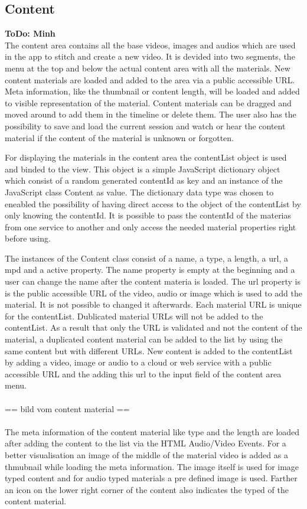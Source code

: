 \documentclass[conference]{IEEEtran}
\begin{document}
\newpage

\subsection{Content}
\textbf{ToDo: Minh} \\
The content area contains all the base videos, images and audios which are used in the app to stitch and create a new video. It is devided into two segments, the menu at the top and below the actual content area with all the materials. New content materials are loaded and added to the area via a public accessible URL. Meta information, like the thumbnail or content length, will be loaded and added to visible representation of the material. Content materials can be dragged and moved around to add them in the timeline or delete them. The user also has the possibility to save and load the current session and watch or hear the content material if the content of the material is unknown or forgotten.

For displaying the materials in the content area the contentList object is used and binded to the view. This object is a simple JavaScript dictionary object which consist of a random generated contentId as key and an instance of the JavaScript class Content as value. The dictionary data type was chosen to eneabled the possibility of having direct access to the object of the contentList by only knowing the contentId. It is possible to pass the contentId of the materias from one service to another and only access the needed material properties right before using.

The instances of the Content class consist of a name, a type, a length, a url, a mpd and a active property. The name property is empty at the beginning and a user can change the name after the content materia is loaded. The url property is is the public accessible URL of the video, audio or image which is used to add the material. It is not possible to changed it afterwards. Each material URL is unique for the contentList. Dublicated material URLs will not be added to the contentList. As a result that only the URL is validated and not the content of the material, a duplicated content material can be added to the list by using the same content but with different URLs. New content is added to the contentList by adding a video, image or audio to a cloud or web service with a public accessible URL and the adding this url to the input field of the content area menu.\\
\\
== bild vom content material ==\\
\\
The meta information of the content material like type and the length are loaded after adding the content to the list via the HTML Audio/Video Events. For a better visualisation an image of the middle of the material video is added as a thmubnail while loading the meta information. The image itself is used for image typed content and for audio typed materials a pre defined image is used. Farther an icon on the lower right corner of the content also indicates the typed of the content material.
\end{document}

